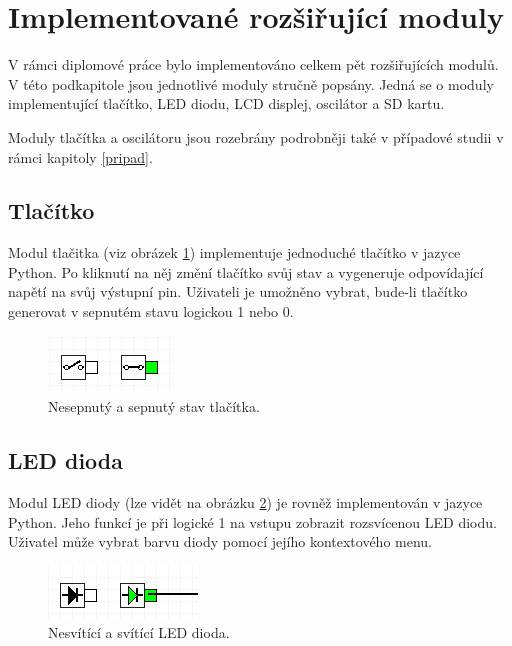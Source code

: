 \section{Implementované rozšiřující moduly}

V rámci diplomové práce bylo implementováno celkem pět rozšiřujících modulů. V této podkapitole jsou jednotlivé moduly stručně popsány. Jedná se o moduly implementující tlačítko, LED diodu, LCD displej, oscilátor a SD kartu.

Moduly tlačítka a oscilátoru jsou rozebrány podrobněji také v případové studii v rámci kapitoly \ref{pripad}.

\subsection{Tlačítko}

Modul tlačitka (viz obrázek \ref{fig:tlacitko}) implementuje jednoduché tlačítko v jazyce Python. Po kliknutí na něj změní tlačítko svůj stav a vygeneruje odpovídající napětí na svůj výstupní pin. Uživateli je umožněno vybrat, bude-li tlačítko generovat v sepnutém stavu logickou 1 nebo 0.

\begin{figure}[ht]
\centering
\includegraphics[trim=0cm 0cm 0cm 0cm, scale=1]{fig/button}
\caption{Nesepnutý a sepnutý stav tlačítka.}
\label{fig:tlacitko}
\end{figure}

\subsection{LED dioda}

Modul LED diody (lze vidět na obrázku \ref{fig:dioda}) je rovněž implementován v jazyce Python. Jeho funkcí je při logické 1 na vstupu zobrazit rozsvícenou LED diodu. Uživatel může vybrat barvu diody pomocí jejího kontextového menu.

\begin{figure}[ht]
\centering
\includegraphics[trim=0cm 0cm 0cm 0cm, scale=1]{fig/led}
\caption{Nesvítící a svítící LED dioda.}
\label{fig:dioda}
\end{figure}


